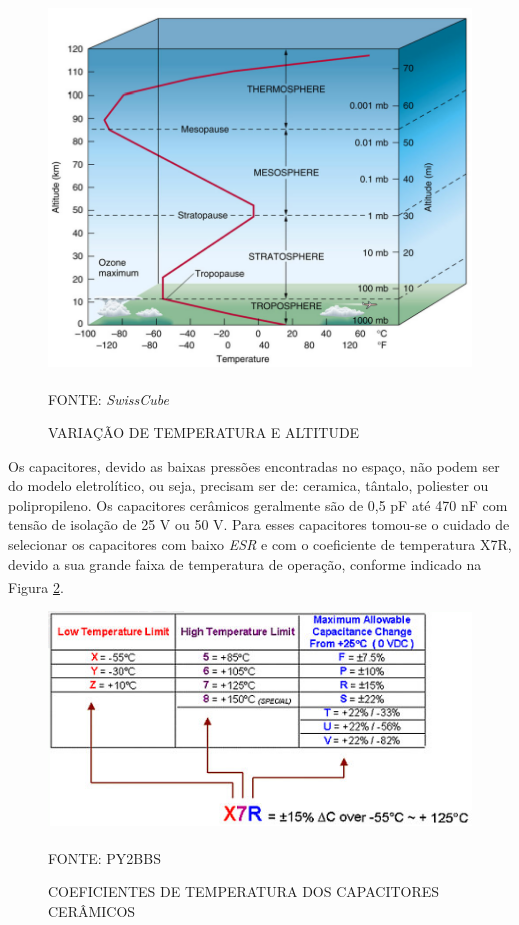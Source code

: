 \documentclass[
	12pt,				%
	openright,			%
	oneside,			%
	a4paper,			%
	english,			%
	french,				%
	spanish,			%
	brazil,				%
	oldfontcommands
	]{abntex2}
\begin{document}
	\begin{figure}[th]
		\caption{VARIAÇÃO DE TEMPERATURA E ALTITUDE}
		\label{Fig_Range_Temp}
		\centering
		\includegraphics[width=0.8\linewidth]{./figs/orbita_temp}
			
		\begin{small}
			FONTE: \textit{SwissCube}\textsuperscript{\cite{SwissCube}}
		\end{small}		
	\end{figure}
	\pagebreak
	
	Os capacitores, devido as baixas pressões encontradas no espaço, não podem ser do modelo eletrolítico, ou seja, precisam ser de: ceramica, tântalo, poliester ou polipropileno. Os capacitores cerâmicos geralmente são de 0,5 pF até 470 nF com tensão de isolação de 25 V ou 50 V. Para esses capacitores tomou-se o cuidado de selecionar os capacitores com baixo \textit{ESR} e com o coeficiente de temperatura X7R, devido a sua grande faixa de temperatura de operação, conforme indicado na Figura \ref{Fig_Cap}.\textsuperscript{\cite{x7r}}
	
	\begin{figure}[th]
		\caption{COEFICIENTES DE TEMPERATURA DOS CAPACITORES CERÂMICOS}
		\label{Fig_Cap}
		\centering
		\includegraphics[width=0.8\linewidth]{./figs/x7r}
			
		\begin{small}
			FONTE: PY2BBS\textsuperscript{\cite{x7r}}
		\end{small}		
	\end{figure}	
	\pagebreak
	
\end{document}
